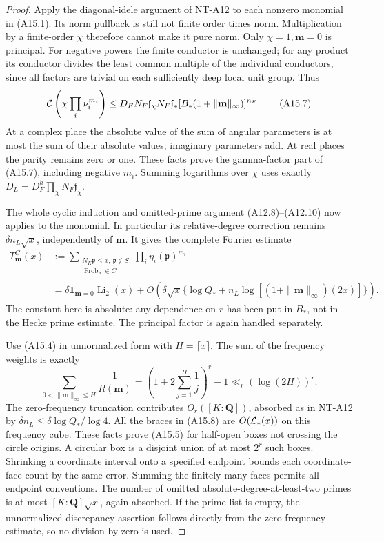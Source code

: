 \begin{proof}
Apply the diagonal-idele argument of NT-A12 to each
nonzero monomial in (A15.1). Its norm pullback is still
not finite order times norm. Multiplication by a
finite-order \(\chi\) therefore cannot make it pure norm.
Only \(\chi=1,\mathbf m=0\) is principal.
For negative powers the finite conductor is unchanged;
for any product its conductor divides the least common
multiple of the individual conductors, since all factors
are trivial on each sufficiently deep local unit group.
Thus
\[
 {\cal C}\left(\chi\prod_i\nu_i^{m_i}\right)
  \le D_FN_F\mathfrak f_\chi N_F\mathfrak f_*
       [B_*(1+\|\mathbf m\|_\infty)]^{n_F}.              \tag{A15.7}
\]
At a complex place the absolute value of the sum of
angular parameters is at most the sum of their absolute
values; imaginary parameters add. At real places the
parity remains zero or one. These facts prove the
gamma-factor part of (A15.7), including negative \(m_i\).
Summing logarithms over \(\chi\) uses exactly
\(D_L=D_F^h\prod_\chi N_F\mathfrak f_\chi\).

The whole cyclic induction and omitted-prime argument
(A12.8)--(A12.10) now applies to the monomial.
In particular its relative-degree correction remains
\(\delta n_L\sqrt x\), independently of \(\mathbf m\).
It gives the complete Fourier estimate
\[
 \begin{split}
 T_{\mathbf m}^C(x)
  &:=
    \sum_{\substack{N_K\mathfrak p\le x,\ \mathfrak p\notin S\\
                     \operatorname{Frob}_{\mathfrak p}\in C}}
                          \prod_i\eta_i(\mathfrak p)^{m_i}\\
  &=\delta\mathbf1_{\mathbf m=0}\operatorname{Li}_2(x)
      +O\left(\delta\sqrt x\{
         \log Q_*+n_L\log[(1+\|\mathbf m\|_\infty)(2x)]
                                  \}\right).
 \end{split}                                                   \tag{A15.8}
\]
The constant here is absolute: any dependence on \(r\)
has been put in \(B_*\), not in the Hecke prime estimate.
The principal factor is again handled separately.

Use (A15.4) in unnormalized form with \(H=\lceil x\rceil\).
The sum of the frequency weights is exactly
\[
 \sum_{0<\|\mathbf m\|_\infty\le H}\frac1{R(\mathbf m)}
       =\left(1+2\sum_{j=1}^H\frac1j\right)^r-1
                     \ll_r(\log(2H))^r .
 \]
The zero-frequency truncation contributes
\(O_r([K:\mathbf Q])\), absorbed as in NT-A12 by
\(\delta n_L\le\delta\log Q_*/\log4\).
All the braces in (A15.8) are \(O({\cal L}_*(x))\)
on this frequency cube. These facts prove (A15.5)
for half-open boxes not crossing the circle origins.
A circular box is a disjoint union of at most \(2^r\)
such boxes. Shrinking a coordinate interval onto a
specified endpoint bounds each coordinate-face count
by the same error. Summing the finitely many faces
permits all endpoint conventions.
The number of omitted absolute-degree-at-least-two
primes is at most \([K:\mathbf Q]\sqrt x\), again
absorbed. If the prime list is empty, the unnormalized
discrepancy assertion follows directly from the
zero-frequency estimate, so no division by zero is used.


\end{proof}

